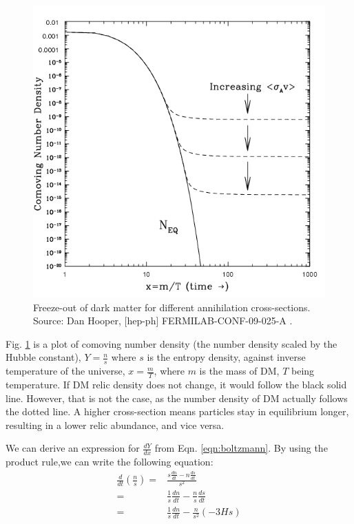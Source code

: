 \documentclass[12pt]{article}
\begin{document}
\begin{figure}
    \includegraphics[width=\linewidth]{Documents/Thesis/Figs/Thermal-freeze-out-of-dark-matter-for-different-annihilation-cross-sections-c-Dan.jpg}
    \caption{Freeze-out of dark matter for different annihilation cross-sections. Source: Dan Hooper, [hep-ph] FERMILAB-CONF-09-025-A \cite{hooper2009tasi2008lecturesdark}.}
    \label{fig:freezeout}
\end{figure}

Fig. \ref{fig:freezeout} is a plot of comoving number density (the number density scaled by the Hubble constant), $Y = \frac{n}{s}$ where $s$ is the entropy density, against inverse temperature of the universe, $x = \frac{m}{T}$, where $m$ is the mass of DM, $T$ being temperature. If DM relic density does not change, it would follow the black solid line. However, that is not the case, as the number density of DM actually follows the dotted line. A higher cross-section means particles stay in equilibrium longer, resulting in a lower relic abundance, and vice versa.

We can derive an expression for $\frac{dY}{dx}$ from Eqn. \ref{eqn:boltzmann}. By using the product rule,we can write the following equation:
\begin{equation}
    \begin{split}
        \frac{d}{dt} \left(\frac{n}{s} \right) =& \frac{s\frac{dn}{dt} - n\frac{ds}{dt}}{s^2}
        \\=& \frac{1}{s}\frac{dn}{dt} - \frac{n}{s}\frac{ds}{dt}
        \\=& \frac{1}{s}\frac{dn}{dt} - \frac{n}{s^2}(-3Hs)
    \end{split}
    \label{eqn:dydt}
\end{equation}
\end{document}
